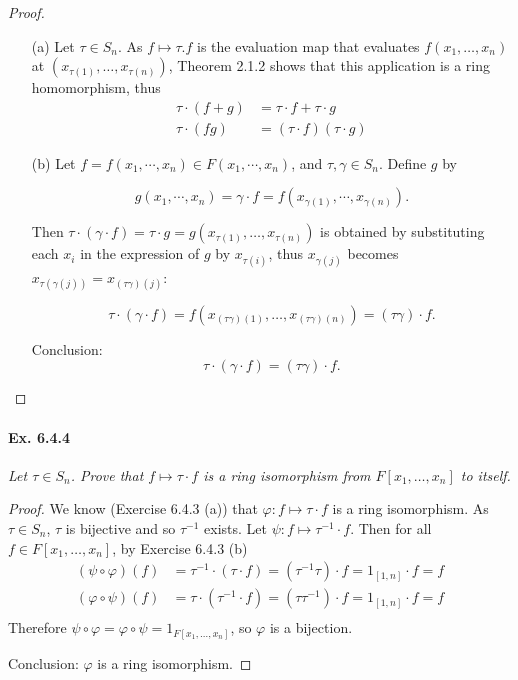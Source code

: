 \documentclass[11pt,a4paper]{article}
\begin{document}
\begin{proof}
\begin{enumerate}
\item[(a)]
Let $\tau \in S_n$. As $f \mapsto \tau.f$ is the evaluation map that evaluates $f(x_1,\ldots,x_n)$ at $(x_{\tau(1)},\ldots,x_{\tau(n)})$, Theorem 2.1.2 shows that this application is a ring homomorphism, thus
\begin{align*}
\tau \cdot (f+g) &= \tau\cdot  f+ \tau\cdot  g\\
\tau \cdot (fg) &= (\tau \cdot  f) (\tau \cdot  g)
\end{align*}

\item[(b)]
Let $f = f(x_1,\cdots,x_n) \in F(x_1,\cdots,x_n)$, and $\tau,\gamma \in S_n$. Define $g$ by

$$g(x_1,\cdots,x_n)  = \gamma \cdot  f = f(x_{\gamma(1)},\cdots,x_{\gamma(n)}).$$

Then $\tau \cdot (\gamma \cdot f) = \tau \cdot g = g(x_{\tau(1)},\ldots,x_{\tau(n)})$ is obtained by substituting each $x_i$ in the expression of $g$ by $x_{\tau(i)}$, thus $x_{\gamma(j)}$ becomes $x_{\tau(\gamma(j))} = x_{(\tau \gamma)(j)}$:

$$\tau\cdot(\gamma \cdot f) = f(x_{(\tau\gamma)(1)},\ldots,x_{(\tau\gamma)(n)}) = (\tau\gamma) \cdot f.$$

Conclusion: $$\tau\cdot (\gamma \cdot f) = (\tau\gamma) \cdot f.$$
\end{enumerate}
\end{proof}

\paragraph{Ex. 6.4.4}

{\it Let $\tau \in S_n$. Prove that $f\mapsto \tau \cdot f$ is a ring isomorphism from $F[x_1,\ldots,x_n]$ to itself.
}

\begin{proof}
We know (Exercise 6.4.3 (a)) that $\varphi : f\mapsto \tau \cdot f$ is a ring isomorphism. As $\tau \in S_n$, $\tau$ is bijective and so $\tau^{-1}$ exists.  Let $\psi : f\mapsto \tau^{-1} \cdot f$. Then for all $f \in F[x_1,\ldots,x_n]$, by Exercise 6.4.3 (b)
\begin{align*}
(\psi \circ \varphi)(f) &= \tau^{-1} \cdot (\tau \cdot f) = (\tau^{-1} \tau)\cdot f = 1_{[1,n]} \cdot f = f\\
(\varphi \circ \psi)(f) &= \tau \cdot (\tau^{-1} \cdot f) = (\tau \tau^{-1})\cdot f = 1_{[1,n]} \cdot f = f\\
\end{align*}
Therefore $\psi \circ \varphi = \varphi \circ \psi = 1_{F[x_1,\ldots,x_n]}$, so $\varphi$ is a bijection.

Conclusion: $\varphi$ is a ring isomorphism.
\end{proof}
\end{document}
